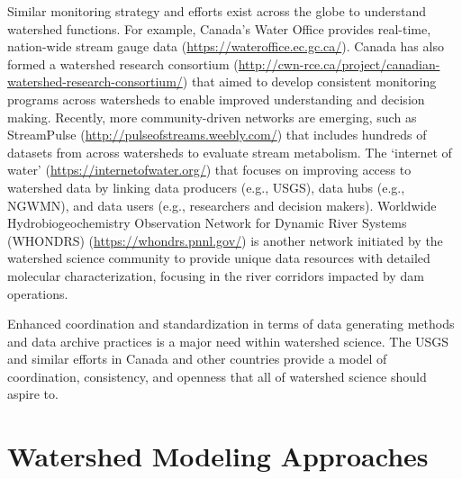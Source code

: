 \documentclass[preprint,review, 12pt]{elsarticle}
\begin{document}
\begin{sloppypar}
Similar monitoring strategy and efforts exist across the globe to understand watershed functions. For example, Canada’s Water Office provides real-time, nation-wide stream gauge data (\url{https://wateroffice.ec.gc.ca/}). Canada has also formed a watershed research consortium (\url{http://cwn-rce.ca/project/canadian-watershed-research-consortium/}) that aimed to develop consistent monitoring programs across watersheds to enable improved understanding and decision making. Recently, more community-driven networks are emerging, such as StreamPulse (\url{http://pulseofstreams.weebly.com/}) that includes hundreds of datasets from across watersheds to evaluate stream metabolism.  The ‘internet of water’ (\url{https://internetofwater.org/}) that focuses on improving access to watershed data by linking data producers (e.g., USGS), data hubs (e.g., NGWMN), and data users (e.g., researchers and decision makers). Worldwide Hydrobiogeochemistry Observation Network for Dynamic River Systems (WHONDRS) (\url{https://whondrs.pnnl.gov/}) is another network initiated by the watershed science community to provide unique data resources with detailed molecular characterization, focusing in the river corridors impacted by dam operations.
\end{sloppypar}

Enhanced coordination and standardization in terms of data generating methods and data archive practices is a major need within watershed science. The USGS and similar efforts in Canada and other countries provide a model of coordination, consistency, and openness that all of watershed science should aspire to.
            

\section{Watershed Modeling Approaches}
\end{document}
